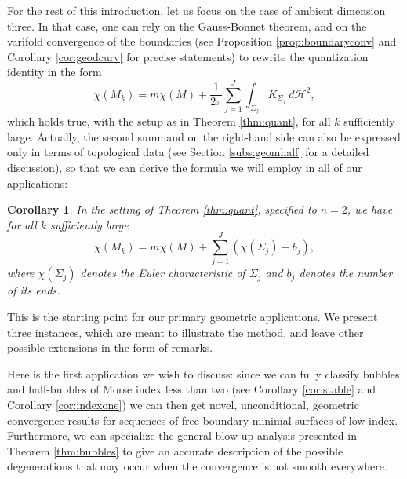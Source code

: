 \documentclass[10pt]{amsart}
\newcounter{cas}
\newtheorem{cor}[thm]{Corollary}
\theoremstyle{definition}
\newcommand{\h}{\mathscr{H}}
\newcommand{\rd}{\ d}
\begin{document}
For the rest of this introduction, let us focus on the case of ambient dimension three. In that case, one can rely on the Gauss-Bonnet theorem, and on the varifold convergence of the boundaries (see Proposition \ref{prop:boundaryconv} and Corollary \ref{cor:geodcurv} for precise statements) to rewrite the quantization identity in the form
\[
\chi(M_k) = m\chi(M) + \frac{1}{2\pi} \sum_{j=1}^J \int_{\Sigma_j} K_{\Sigma_j} \rd \h^2,
\]
which holds true, with the setup as in Theorem \ref{thm:quant}, for all $k$ sufficiently large. Actually, the second summand on the right-hand side can also be expressed only in terms of topological data (see Section \ref{subs:geomhalf} for a detailed discussion), so that we can derive the formula we will employ in all of our applications:

\begin{cor}\label{cor:chi}
In the setting of Theorem \ref{thm:quant}, specified to $n=2$, we have for all $k$ sufficiently large
\begin{equation*}\label{eq:topfundsymINTRO}
\chi(M_k)= m\chi(M)+ \sum_{j=1}^J (\chi(\Sigma_j)-b_j),
\end{equation*}
where $\chi(\Sigma_j)$ denotes the Euler characteristic of $\Sigma_j$ and $b_j$ denotes the number of its ends.
\end{cor}

This is the starting point for our primary geometric applications. We present three instances, which are meant to illustrate the method, and leave other possible extensions in the form of remarks.

Here is the first application we wish to discuss: since we can fully classify bubbles and half-bubbles of Morse index less than two (see Corollary \ref{cor:stable} and Corollary \ref{cor:indexone}) we can then get novel, unconditional, geometric convergence results for sequences of free boundary minimal surfaces of low index. Furthermore, we can specialize the general blow-up analysis presented in Theorem \ref{thm:bubbles} to give an accurate description of the possible degenerations that may occur when the convergence is not smooth everywhere.
\end{document}
